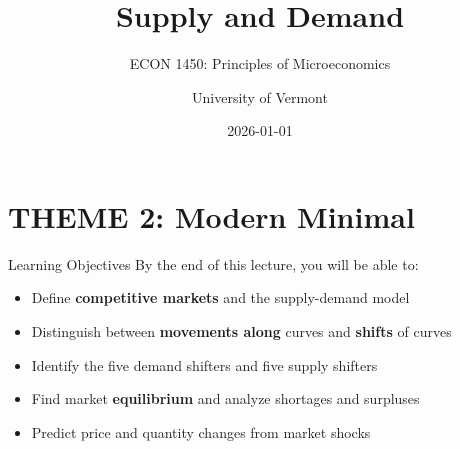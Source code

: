 \documentclass[
  ignorenonframetext,
  aspectratio=169,
]{beamer}
\title{Supply and Demand}
\subtitle{ECON 1450: Principles of Microeconomics}
\author{University of Vermont}
\date{2026-01-01}
\institute{Department of Economics}
\providecommand{\tightlist}{%
  \setlength{\itemsep}{0pt}\setlength{\parskip}{0pt}}
\begin{document}
\frame{\titlepage}


\section{THEME 2: Modern Minimal}\label{theme-2-modern-minimal}


\begin{frame}{Learning Objectives}
\label{learning-objectives}
By the end of this lecture, you will be able to:

\begin{itemize}
\tightlist
\item
  Define \textbf{competitive markets} and the supply-demand model
\item
  Distinguish between \textbf{movements along} curves and
  \textbf{shifts} of curves
\item
  Identify the five demand shifters and five supply shifters
\item
  Find market \textbf{equilibrium} and analyze shortages and surpluses
\item
  Predict price and quantity changes from market shocks
\end{itemize}
\end{frame}
\end{document}

